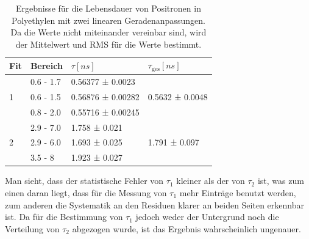 \documentclass[a4paper,12pt]{article}
\begin{document}
\begin{table}[h]
	\begin{tabular}{l |l l ||l}
			Fit& Bereich & $τ [\si{ns}]$ & $τ_\text{ges} [\si{ns}]$ \\
		\hline
		\multirow{3}{*}{1} &0.6 - 1.7&  0.56377 ± 0.0023  &\multirow{3}{*}{0.5632 ± 0.0048}\\
			 &0.6 - 1.5&  0.56876 ± 0.00282 &\\
			 &0.8 - 2.0&  0.55716 ± 0.00245 &\\
		\hline
		\multirow{3}{*}{2} & 2.9 - 7.0 &  1.758 ± 0.021 &\multirow{3}{*}{1.791 ± 0.097}\\
			&2.9 - 6.0&  1.693 ± 0.025 & \\
			&3.5 - 8&  1.923 ± 0.027  &
	\end{tabular}
	\centering
	\caption{Ergebnisse für die Lebensdauer von Positronen in Polyethylen mit zwei linearen
		Geradenanpassungen. Da die Werte nicht miteinander vereinbar sind, wird der Mittelwert und
	RMS für die Werte bestimmt.}
	\label{tab:linearPoly}
\end{table}

Man sieht, dass der statistische Fehler von $τ_1$ kleiner als der von $τ_2$ ist, was zum einen daran
liegt, dass für die Messung von $τ_1$ mehr Einträge benutzt werden, zum anderen die Systematik an
den Residuen klarer an beiden Seiten erkennbar ist. Da für die Bestimmung von $τ_1$ jedoch weder der
Untergrund noch die Verteilung von $τ_2$ abgezogen wurde, ist das Ergebnis wahrscheinlich ungenauer.

\FloatBarrier
\end{document}

